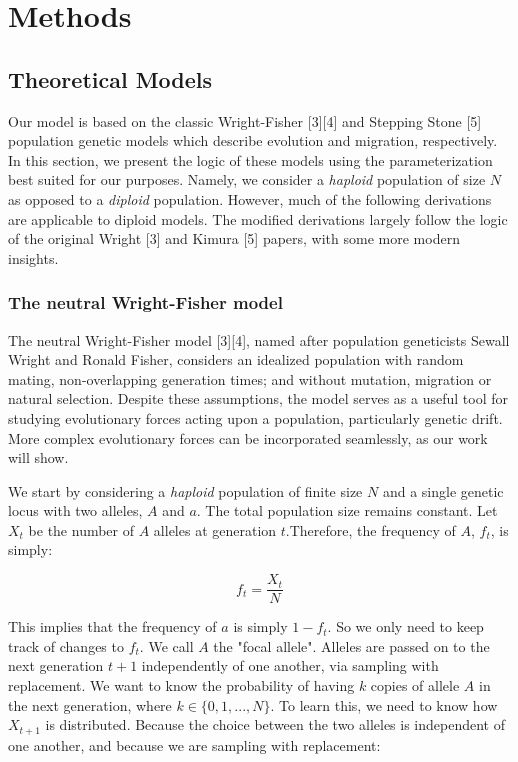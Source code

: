 \chapter{Methods}

\section{Theoretical Models}

Our model is based on the classic Wright-Fisher [3][4] and Stepping Stone [5] population genetic models which describe evolution and migration, respectively. In this section, we present the logic of these models using the parameterization best suited for our purposes. Namely, we consider a \textit{haploid} population of size $N$ as opposed to a \textit{diploid} population. However, much of the following derivations are applicable to diploid models. The modified derivations largely follow the logic of the original Wright [3] and Kimura [5] papers, with some more modern insights.\cite{Rackauckas2014AnII}\cite{tran_2012} \cite{durret_2008}


\subsection{The neutral Wright-Fisher model} \label{section:neutral_wf}

The neutral Wright-Fisher model [3][4], named after population geneticists Sewall Wright and Ronald Fisher, considers an idealized population with random mating, non-overlapping generation times; and without mutation, migration or natural selection. Despite these assumptions, the model serves as a useful tool for studying evolutionary forces acting upon a population, particularly genetic drift. More complex evolutionary forces can be incorporated seamlessly, as our work will show. 


We start by considering a \textit{haploid} population of finite size $N$ and a single genetic locus with two alleles, $A$ and $a$. The total population size remains constant. Let $X_t$ be the number of $A$ alleles at generation $t$.Therefore, the frequency of $A$, $f_t$, is simply:

\begin{equation}
    f_t = \frac{X_t}{N}
\end{equation}

This implies that the frequency of $a$ is simply $1-f_t$. So we only need to keep track of changes to $f_t$. We call $A$ the "focal allele". Alleles are passed on to the next generation $t+1$ independently of one another, via sampling with replacement. We want to know the probability of having $k$ copies of allele $A$ in the next generation, where $k \in \{0,1,...,N\}$. To learn this, we need to know how $X_{t+1}$ is distributed. Because the choice between the two alleles is independent of one another, and because we are sampling with replacement:

